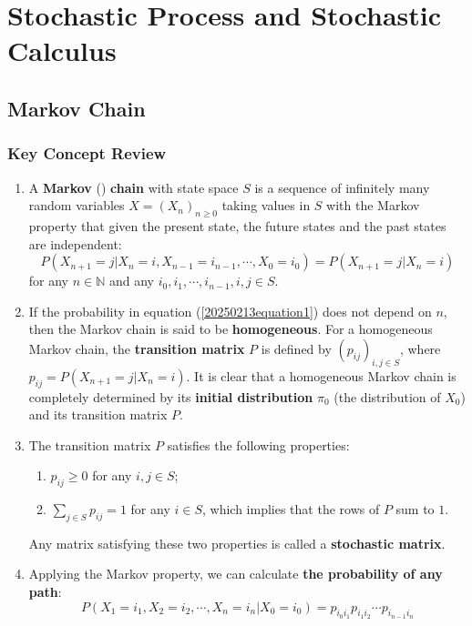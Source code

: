 \documentclass[12pt,letterpaper, onecolumn]{exam}
\begin{document}
    \section{Stochastic Process and Stochastic Calculus}

    \subsection{Markov Chain}
    \subsubsection{Key Concept Review}
    \begin{enumerate}
        \item A \textbf{Markov} () \textbf{chain} with state space $S$ is a sequence of infinitely many random variables $X=(X_n)_{n\ge 0}$ taking values in $S$ with the Markov property that given the present state, the future states and the past states are independent:
        \begin{equation}\label{20250213equation1}
            P(X_{n+1}=j|X_n=i,X_{n-1}=i_{n-1},\cdots,X_0=i_0)=P(X_{n+1}=j|X_n=i)
        \end{equation}
        for any $n\in\mathbb{N}$ and any $i_0,i_1,\cdots,i_{n-1},i,j\in S$.
        \item If the probability in equation (\ref{20250213equation1}) does not depend on $n$, then the Markov chain is said to be \textbf{homogeneous}. For a homogeneous Markov chain, the \textbf{transition matrix} $P$ is defined by $(p_{ij})_{i,j\in S}$, where $p_{ij}=P(X_{n+1}=j|X_n=i)$. It is clear that a homogeneous Markov chain is completely determined by its \textbf{initial distribution} $\pi_0$ (the distribution of $X_0$) and its transition matrix $P$.
        \item The transition matrix $P$ satisfies the following properties:
        \begin{enumerate}
            \item $p_{ij}\ge 0$ for any $i,j\in S$;
            \item $\sum_{j\in S}p_{ij}=1$ for any $i\in S$, which implies that the rows of $P$ sum to $1$.
        \end{enumerate}
        Any matrix satisfying these two properties is called a \textbf{stochastic matrix}.
        \item Applying the Markov property, we can calculate \textbf{the probability of any path}:
        $$P(X_1=i_1,X_2=i_2,\cdots,X_n=i_n|X_0=i_0)=p_{i_0i_1}p_{i_1i_2}\cdots p_{i_{n-1}i_n}$$

\end{enumerate}
\end{document}
